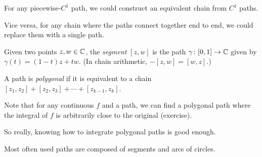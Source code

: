 \documentclass[10pt,aspectratio=169]{beamer}
\begin{document}
\begin{frame}
For any piecewise-$C^1$ path, we could construct an equivalent
chain from $C^1$ paths.

\medskip
\pause

Vice versa, for any chain where the paths connect together end to end,
we could replace them with a single path.

\medskip
\pause

Given two points $z,w \in {\mathbb{C}}$, the \emph{segment} $[z,w]$ is the path
$\gamma \colon [0,1] \to {\mathbb{C}}$ given by $\gamma(t) = (1-t)z + tw$.
\pause
(In chain arithmetic, $-[z,w] = [w,z]$.)

\medskip
\pause

A path is \emph{polygonal} if it is equivalent to a chain
$[z_1,z_2] + [z_2,z_3] + \cdots + [z_{k-1},z_k]$.

\medskip
\pause

Note that for any continuous $f$ and a path, we can find a polygonal
path where the integral of $f$ is arbitrarily close to the original (exercise).

\medskip
\pause

So really, knowing how to integrate polygonal paths is
good enough.

\medskip
\pause

Most often used paths are composed of segments and arcs of circles.
\end{frame}
\end{document}
